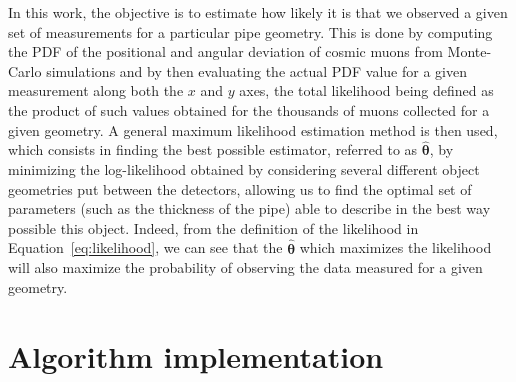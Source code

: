 \documentclass[a4paper, 11pt, twoside, openright]{report}
\begin{document}
In this work, the objective is to estimate how likely it is that we observed a given set of measurements for a particular pipe geometry. This is done by computing the PDF of the positional and angular deviation of cosmic muons from Monte-Carlo simulations and by then evaluating the actual PDF value for a given measurement along both the $x$ and $y$ axes, the total likelihood being defined as the product of such values obtained for the thousands of muons collected for a given geometry. A general maximum likelihood estimation method is then used, which consists in finding the best possible estimator, referred to as $\bm \hat \theta$, by minimizing the log-likelihood obtained by considering several different object geometries put between the detectors, allowing us to find the optimal set of parameters (such as the thickness of the pipe) able to describe in the best way possible this object. Indeed, from the definition of the likelihood in Equation~\ref{eq:likelihood}, we can see that the $\bm \hat \theta$ which maximizes the likelihood will also maximize the probability of observing the data measured for a given geometry.



























\chapter{Algorithm implementation} \label{chapter:algorithm}
\end{document}
